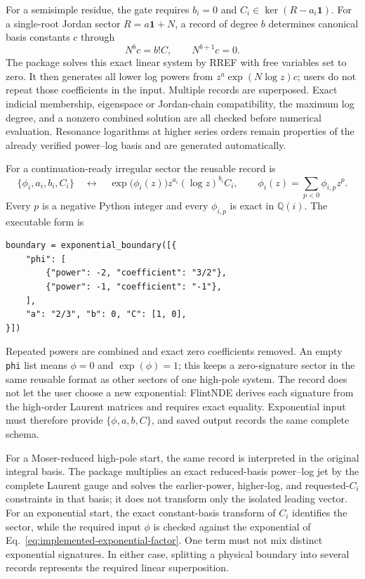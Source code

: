 \documentclass[11pt]{article}
\newcommand{\Id}{\mathbf 1}
\begin{document}
For a semisimple residue, the gate requires $b_i=0$ and
$C_i\in\ker(R-a_i\Id)$.  For a single-root Jordan sector
$R=a\Id+N$, a record of degree $b$ determines canonical basis constants $c$ through
\begin{equation}
  N^b c=b!C,
  \qquad N^{b+1}c=0.
  \label{eq:frobenius-boundary-jordan-recovery}
\end{equation}
The package solves this exact linear system by RREF with free variables set to zero.  It
then generates all lower log powers from $z^a\exp(N\log z)c$; users do not repeat those
coefficients in the input.  Multiple records are superposed.  Exact indicial membership,
eigenspace or Jordan-chain compatibility, the maximum log degree, and a nonzero combined
solution are all checked before numerical evaluation.  Resonance logarithms at higher
series orders remain properties of the already verified power--log basis and are generated
automatically.

For a continuation-ready irregular sector the reusable record is
\begin{equation}
  \bigl\{\phi_i,a_i,b_i,C_i\bigr\}
  \quad\longleftrightarrow\quad
  \exp\!\bigl(\phi_i(z)\bigr)z^{a_i}(\log z)^{b_i}C_i,
  \qquad
  \phi_i(z)=\sum_{p<0}\phi_{i,p}z^p .
  \label{eq:exponential-boundary-record}
\end{equation}
Every $p$ is a negative Python integer and every $\phi_{i,p}$ is exact in
$\mathbb Q(i)$.  The executable form is
\begin{verbatim}
boundary = exponential_boundary([{
    "phi": [
        {"power": -2, "coefficient": "3/2"},
        {"power": -1, "coefficient": "-1"},
    ],
    "a": "2/3", "b": 0, "C": [1, 0],
}])
\end{verbatim}
Repeated powers are combined and exact zero coefficients removed.  An empty
\texttt{phi} list means $\phi=0$ and $\exp(\phi)=1$; this keeps a zero-signature sector in
the same reusable format as other sectors of one high-pole system.  The record does not let
the user choose a new exponential: FlintNDE derives each signature from the high-order
Laurent matrices and requires exact equality.  Exponential input must therefore provide
$\{\phi,a,b,C\}$, and saved output records the same complete schema.

For a Moser-reduced high-pole start, the same record is interpreted in the original integral
basis.  The package multiplies an exact reduced-basis power--log jet by the complete Laurent
gauge and solves the earlier-power, higher-log, and requested-$C_i$ constraints in that basis;
it does not transform only the isolated leading vector.  For an exponential start, the exact
constant-basis transform of $C_i$ identifies the sector, while the required input $\phi$ is
checked against the exponential of Eq.~\eqref{eq:implemented-exponential-factor}.  One term
must not mix distinct
exponential signatures.  In either case, splitting a physical boundary into several records
represents the required linear superposition.
\end{document}
